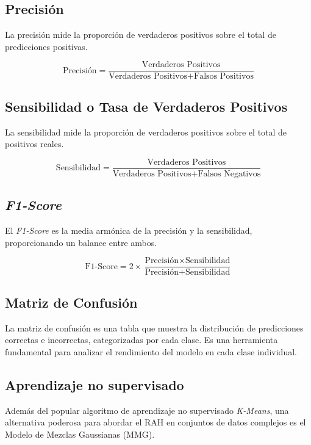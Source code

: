 \documentclass{esannV2}
\begin{document}
\subsection*{Precisión}
La precisión mide la proporción de verdaderos positivos sobre el total de predicciones positivas.

\begin{equation}
\text{Precisión} = \frac{\text{Verdaderos Positivos}}{\text{Verdaderos Positivos} + \text{Falsos Positivos}}
\end{equation}

\subsection*{Sensibilidad o Tasa de Verdaderos Positivos}
La sensibilidad mide la proporción de verdaderos positivos sobre el total de positivos reales.

\begin{equation}
\text{Sensibilidad} = \frac{\text{Verdaderos Positivos}}{\text{Verdaderos Positivos} + \text{Falsos Negativos}}
\end{equation}

\subsection*{\textit{F1-Score}}
El \textit{F1-Score} es la media armónica de la precisión y la sensibilidad, proporcionando un balance entre ambos.

\begin{equation}
\text{F1-Score} = 2 \times \frac{\text{Precisión} \times \text{Sensibilidad}}{\text{Precisión} + \text{Sensibilidad}}
\end{equation}

\subsection*{Matriz de Confusión}
La matriz de confusión es una tabla que muestra la distribución de predicciones correctas e incorrectas, categorizadas por cada clase. Es una herramienta fundamental para analizar el rendimiento del modelo en cada clase individual.
\subsection{Aprendizaje no supervisado}
Además del popular algoritmo de aprendizaje no supervisado \textit{K-Means}, una alternativa poderosa para abordar el RAH en conjuntos de datos complejos es el Modelo de Mezclas Gaussianas (MMG).
\end{document}
